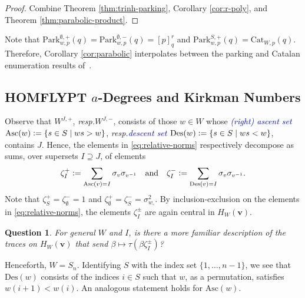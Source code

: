 \documentclass[submission]{FPSAC2025}
\newtheorem{quest}{Question}
\newcommand{\dfemph}[1]{\textcolor{blue}{\emph{#1}}}
\newcommand{\m}{p}
\newcommand{\x}{\mathbf{v}}
\newcommand{\Asc}{\mathrm{Asc}}
\newcommand{\Des}{\mathrm{Des}}
\newcommand{\Cat}{\mathrm{Cat}}
\newcommand{\Park}{\mathrm{Park}}
\begin{document}
\begin{proof}
Combine Theorem \ref{thm:trinh-parking}, Corollary \ref{cor:r-poly}, and Theorem \ref{thm:parabolic-product}.
\end{proof}

Note that $\Park_{w, \m}^{\emptyset, +}(q) = \Park_{w, \m}^{\emptyset, -}(q) = [\m]_q^r$ and $\Park_{w, \m}^{S, +}(q) = \Cat_{W, \m}(q)$.
Therefore, Corollary \ref{cor:parabolic} interpolates between the parking and Catalan enumeration results of~\cite{gltw}.

\subsection{HOMFLYPT $a$-Degrees and Kirkman Numbers}\label{subsec:kirkman}

Observe that $W^{J, +}$, \emph{resp.}\@ $W^{J, -}$, consists of those $w \in W$ whose \dfemph{(right) ascent set} $\Asc(w) \vcentcolon= \{s \in S \mid ws > w\}$, \emph{resp.}\@ \dfemph{descent set} $\Des(w) \vcentcolon= \{s \in S \mid ws < w\}$, contains $J$.
Hence, the elements in \eqref{eq:relative-norms} respectively decompose as sums, over supersets $I \supseteq J$, of elements
\begin{align}
\zeta_I^+ \vcentcolon= \sum_{\Asc(v) = I} \sigma_v \sigma_{v^{-1}}
	\quad\text{and}\quad
	\zeta_I^- \vcentcolon= \sum_{\Des(v) = I} \sigma_v \sigma_{v^{-1}}.
\end{align}
Note that $\zeta_S^+ = \zeta_\emptyset^- = 1$ and $\zeta_\emptyset^+ = \zeta_S^- =\sigma_{w_\circ}^2$.
By inclusion-exclusion on the elements in \eqref{eq:relative-norms}, the elements $\zeta_I^\pm$ are again central in $H_W(\x)$.

\begin{quest}
For general $W$ and $I$, is there a more familiar description of the traces on $H_W(\x)$ that send $\beta \mapsto \tau(\beta \zeta_I^\pm)$?
\end{quest}

Henceforth, $W = S_n$.
Identifying $S$ with the index set $\{1, \ldots, n - 1\}$, we see that $\Des(w)$ consists of the indices $i \in S$ such that $w$, as a permutation, satisfies $w(i + 1) < w(i)$.
An analogous statement holds for $\Asc(w)$.
\end{document}
